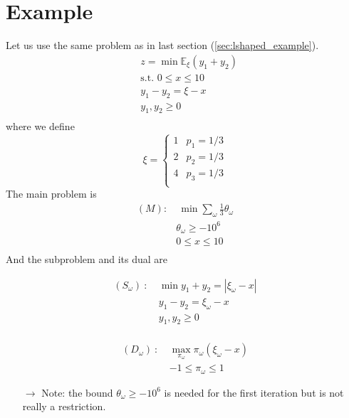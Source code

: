 \documentclass[12pt, openany]{report}
\newcommand{\E}{\mathbb{E}}
\theoremstyle{definition}
\begin{document}
\section{Example}
Let us use the same problem as in last section (\ref{sec:lshaped_example}). 
\begin{equation}
	\begin{aligned}
		&z = \min\E_\xi(y_1 + y_2)\\
		& \text{s.t. }0\le x\le 10\\
		& y_1-y_2 = \xi-x\\
		& y_1,y_2\ge 0\\
	\end{aligned}
\end{equation}
where we define 
\begin{equation}
	\xi = \begin{cases}
		1 & p_1 = 1/3\\
		2 & p_2 = 1/3\\
		4 & p_3 = 1/3\\
	\end{cases}
\end{equation}
The main problem is 
\begin{equation}
	\begin{aligned}
		(M): & \ \min \sum_\omega \frac{1}{3}\theta_\omega\\
		& \theta_\omega \ge -10^6\\
		& 0\le x\le 10\\
	\end{aligned}
\end{equation}
And the subproblem and its dual are \\
\begin{minipage}{.5\textwidth}
	\begin{equation}
		\begin{aligned}
			(S_\omega)\ : \ &\min y_1 + y_2 = |\xi_\omega-x|\\
			& y_1 - y_2 = \xi_\omega - x\\
			& y_1,y_2 \ge 0\\
		\end{aligned}
	\end{equation}
\end{minipage}
\begin{minipage}{.5\textwidth}
	\begin{equation}\label{eq:dual}
		\begin{aligned}
			(D_\omega) \ : \ & \max_{\pi_\omega} \pi_\omega(\xi_\omega-x)\\
			&-1\le \pi_\omega \le 1
		\end{aligned}
	\end{equation}
\end{minipage}
\begin{itemize}
	\item [$\to$] Note: the bound $\theta_\omega \ge -10^6$ is needed for the first iteration but is not really a restriction. 
\end{itemize}
\end{document}
